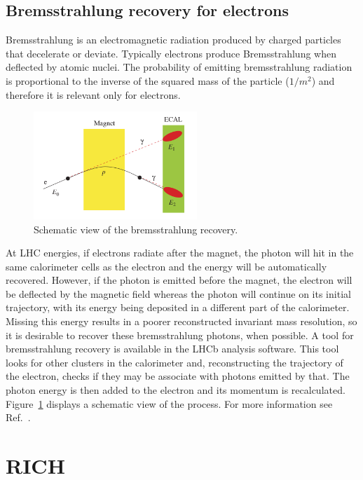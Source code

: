 \subsection{Bremsstrahlung recovery for electrons}

Bremsstrahlung is an electromagnetic radiation produced by charged particles that decelerate or deviate. 
Typically electrons produce Bremsstrahlung when deflected by atomic nuclei.
The probability of emitting bremsstrahlung radiation is proportional to the inverse of the squared mass of the
particle ($1/m^2$) and therefore it is relevant only for electrons.
%
\begin{figure}[h!]
\centering
\includegraphics[width=0.55\textwidth]{RKst/figs/brem_recovery.png}
\caption{Schematic view of the bremsstrahlung recovery. }
\label{fig:bremreco}
\end{figure}
%
At LHC energies, if electrons radiate after
the magnet, the photon will hit in the same calorimeter cells as the electron and the energy will be automatically
recovered. However, if the photon is emitted before the magnet, the electron will be deflected by the magnetic
field whereas the photon will continue on its initial trajectory, with its energy being deposited in a different
part of the calorimeter. Missing this energy results in a poorer reconstructed invariant mass resolution, so it is
desirable to recover these bremsstrahlung photons, when possible. A tool for bremsstrahlung recovery is available
in the LHCb analysis software. This tool looks for other clusters in the calorimeter and, reconstructing the trajectory
of the electron, checks if they may be associate with photons emitted by that. The photon energy is then added to 
the electron and its momentum is recalculated. Figure~\ref{fig:bremreco} displays a schematic view of the process. 
For more information see Ref.~\cite{LHCb:2003ab}.

\section{RICH}

